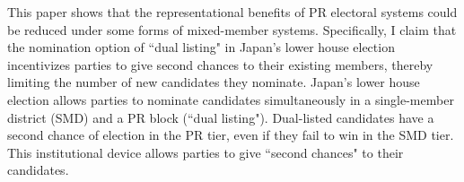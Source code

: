 \documentclass[a4paper, 11pt]{article}
\begin{document}


This paper shows that the representational benefits of PR electoral systems could be reduced under some forms of mixed-member systems. Specifically, I claim that the nomination option of ``dual listing" in Japan's lower house election incentivizes parties to give second chances to their existing members, thereby limiting the number of new candidates they nominate. Japan's lower house election allows parties to nominate candidates simultaneously in a single-member district (SMD) and a PR block (``dual listing"). Dual-listed candidates have a second chance of election in the PR tier, even if they fail to win in the SMD tier. This institutional device allows parties to give ``second chances" to their candidates. 
\end{document}
